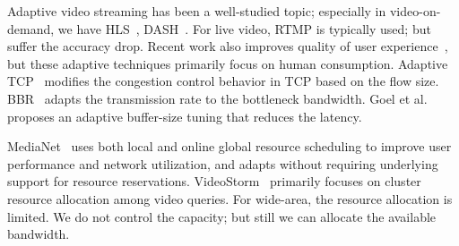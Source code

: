  Adaptive video streaming has been a
well-studied topic; especially in video-on-demand, we have
HLS~\cite{pantos2016http}, DASH~\cite{michalos2012dynamic}. For live video, RTMP
is typically used; but suffer the accuracy drop. Recent work also improves
quality of user experience~\cite{yin2015control}, but these adaptive techniques
primarily focus on human consumption. Adaptive TCP~\cite{wu2013adaptive}
modifies the congestion control behavior in TCP based on the flow
size. BBR~\cite{cardwell2017bbr} adapts the transmission rate to the bottleneck
bandwidth. Goel et al.~\cite{goel2008low} proposes an adaptive buffer-size
tuning that reduces the latency.

 MediaNet~\cite{hicks2003user} uses both local
and online global resource scheduling to improve user performance and network
utilization, and adapts without requiring underlying support for resource
reservations. VideoStorm~\cite{zhang2017live} primarily focuses on cluster
resource allocation among video queries. For wide-area, the resource allocation
is limited. We do not control the capacity; but still we can allocate the
available bandwidth.




